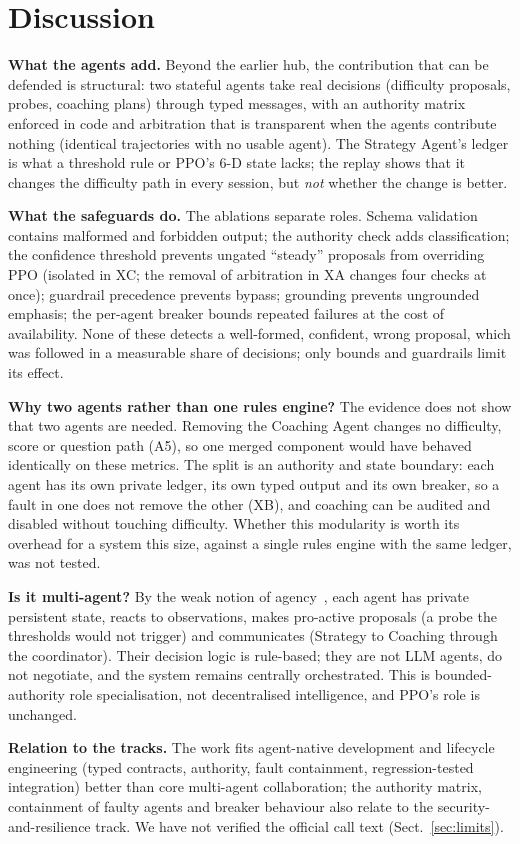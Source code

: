 \section{Discussion}
\textbf{What the agents add.} Beyond the earlier hub, the contribution that can be defended is structural: two stateful agents take real decisions (difficulty proposals, probes, coaching plans) through typed messages, with an authority matrix enforced in code and arbitration that is transparent when the agents contribute nothing (identical trajectories with no usable agent). The Strategy Agent's ledger is what a threshold rule or PPO's 6-D state lacks; the replay shows that it changes the difficulty path in every session, but \emph{not} whether the change is better.

\textbf{What the safeguards do.} The ablations separate roles. Schema validation contains malformed and forbidden output; the authority check adds classification; the confidence threshold prevents ungated ``steady'' proposals from overriding PPO (isolated in XC; the removal of arbitration in XA changes four checks at once); guardrail precedence prevents bypass; grounding prevents ungrounded emphasis; the per-agent breaker bounds repeated failures at the cost of availability. None of these detects a well-formed, confident, wrong proposal, which was followed in a measurable share of decisions; only bounds and guardrails limit its effect.

\textbf{Why two agents rather than one rules engine?} The evidence does not show that two agents are needed. Removing the Coaching Agent changes no difficulty, score or question path (A5), so one merged component would have behaved identically on these metrics. The split is an authority and state boundary: each agent has its own private ledger, its own typed output and its own breaker, so a fault in one does not remove the other (XB), and coaching can be audited and disabled without touching difficulty. Whether this modularity is worth its overhead for a system this size, against a single rules engine with the same ledger, was not tested.

\textbf{Is it multi-agent?} By the weak notion of agency~\cite{wj95}, each agent has private persistent state, reacts to observations, makes pro-active proposals (a probe the thresholds would not trigger) and communicates (Strategy to Coaching through the coordinator). Their decision logic is rule-based; they are not LLM agents, do not negotiate, and the system remains centrally orchestrated. This is bounded-authority role specialisation, not decentralised intelligence, and PPO's role is unchanged.

\textbf{Relation to the tracks.} The work fits agent-native development and lifecycle engineering (typed contracts, authority, fault containment, regression-tested integration) better than core multi-agent collaboration; the authority matrix, containment of faulty agents and breaker behaviour also relate to the security-and-resilience track. We have not verified the official call text (Sect.~\ref{sec:limits}).
